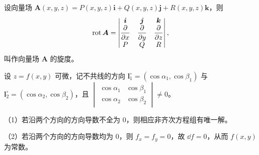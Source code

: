 \quad 设向量场
$\bm A(x,y,z)=P(x,y,z)\bm i+Q(x,y,z)\bm j+R(x,y,z)\bm k$，则
\[
\operatorname{rot}\bm A=
\begin{vmatrix}
\bm i&\bm j&\bm k\\
\dfrac{\partial}{\partial x}&\dfrac{\partial}{\partial y}&\dfrac{\partial}{\partial z}\\
P&Q&R
\end{vmatrix},
\]
叫作向量场 $\bm A$ 的旋度。

\begin{notebox}
设 $z=f(x,y)$ 可微，记不共线的方向
$\bm l_1^\circ=(\cos\alpha_1,\cos\beta_1)$ 与
$\bm l_2^\circ=(\cos\alpha_2,\cos\beta_2)$，且
$\begin{vmatrix}\cos\alpha_1&\cos\beta_1\\
\cos\alpha_2&\cos\beta_2\end{vmatrix}\ne0$。

（1）若沿两个方向的方向导数不全为 $0$，则相应非齐次方程组有唯一解。

（2）若沿两个方向的方向导数均为 $0$，则 $f_x=f_y=0$，故 $\dd f=0$，从而 $f(x,y)$ 为常数。
\end{notebox}

